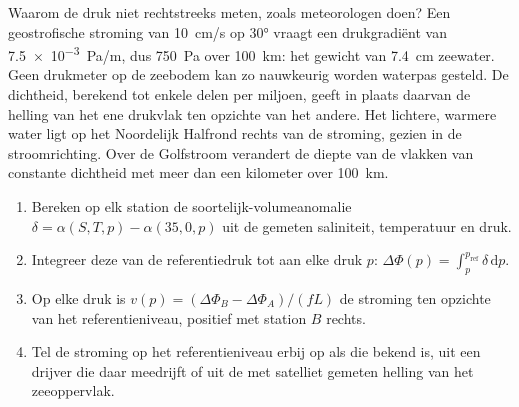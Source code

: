 Waarom de druk niet rechtstreeks meten, zoals meteorologen doen? Een geostrofische
stroming van \qty{10}{cm/s} op \ang{30} vraagt een drukgradiënt van
\qty{7.5e-3}{Pa/m}, dus \qty{750}{Pa} over \qty{100}{km}: het gewicht van
\qty{7.4}{cm} zeewater. Geen drukmeter op de zeebodem kan zo nauwkeurig worden
waterpas gesteld. De dichtheid, berekend tot enkele delen per miljoen, geeft
in plaats daarvan de helling van het ene drukvlak ten opzichte van het andere. Het
lichtere, warmere water ligt op het Noordelijk Halfrond rechts van de stroming,
gezien in de stroomrichting. Over de Golfstroom verandert de diepte van de
vlakken van constante dichtheid met meer dan een kilometer over \qty{100}{km}.

\begin{method}\label{met:b3:ocean-dynamics:dynamic}
\begin{enumerate}
\item Bereken op elk station de soortelijk-volumeanomalie $\delta =
  \alpha(S, T, p) - \alpha(35, 0, p)$ uit de gemeten saliniteit,
  temperatuur en druk.
\item Integreer deze van de referentiedruk tot aan elke druk $p$:
  $\Delta\Phi(p) = \int_p^{p_{\text{ref}}}\delta\,\mathrm dp$.
\item Op elke druk is $v(p) = (\Delta\Phi_B - \Delta\Phi_A)/(fL)$ de
  stroming ten opzichte van het referentieniveau, positief met station $B$
  rechts.
\item Tel de stroming op het referentieniveau erbij op als die bekend is, uit een
  drijver die daar meedrijft of uit de met satelliet gemeten helling van het zeeoppervlak.
\end{enumerate}
\end{method}

